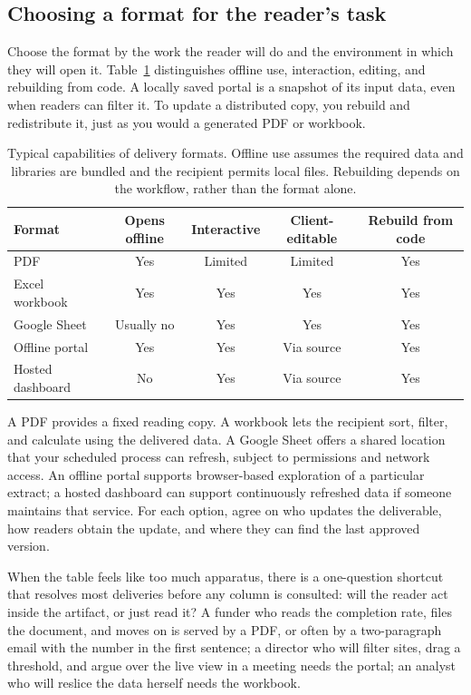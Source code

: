 \subsection{Choosing a format for the reader's task}
Choose the format by the work the reader will do and the environment in which they will open it. Table~\ref{tab:formats} distinguishes offline use, interaction, editing, and rebuilding from code. A locally saved portal is a snapshot of its input data, even when readers can filter it. To update a distributed copy, you rebuild and redistribute it, just as you would a generated PDF or workbook.

\begin{table}[htbp]
\centering
\footnotesize
\caption[Delivery formats compared]{Typical capabilities of delivery formats. Offline use assumes the required data and libraries are bundled and the recipient permits local files. Rebuilding depends on the workflow, rather than the format alone.}
\label{tab:formats}
\begin{tabular}{lcccc}
\hline
Format & Opens offline & Interactive & Client-editable & Rebuild from code \\
\hline
PDF               & Yes & Limited & Limited & Yes \\
Excel workbook    & Yes & Yes & Yes & Yes \\
Google Sheet      & Usually no & Yes & Yes & Yes \\
Offline portal    & Yes & Yes & Via source & Yes \\
Hosted dashboard  & No & Yes & Via source & Yes \\
\hline
\end{tabular}
\end{table}

A PDF provides a fixed reading copy. A workbook lets the recipient sort, filter, and calculate using the delivered data. A Google Sheet offers a shared location that your scheduled process can refresh, subject to permissions and network access. An offline portal supports browser-based exploration of a particular extract; a hosted dashboard can support continuously refreshed data if someone maintains that service. For each option, agree on who updates the deliverable, how readers obtain the update, and where they can find the last approved version.

When the table feels like too much apparatus, there is a one-question shortcut that resolves most deliveries before any column is consulted: will the reader act inside the artifact, or just read it? A funder who reads the completion rate, files the document, and moves on is served by a PDF, or often by a two-paragraph email with the number in the first sentence; a director who will filter sites, drag a threshold, and argue over the live view in a meeting needs the portal; an analyst who will reslice the data herself needs the workbook.

